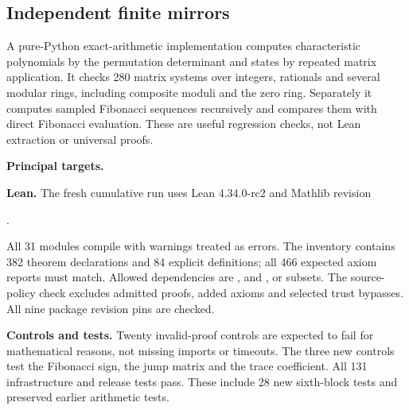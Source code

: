 \subsection*{Independent finite mirrors}
A pure-Python exact-arithmetic implementation computes characteristic polynomials by the permutation determinant and states by repeated matrix application. It checks 280 matrix systems over integers, rationals and several modular rings, including composite moduli and the zero ring. Separately it computes sampled Fibonacci sequences recursively and compares them with direct Fibonacci evaluation. These are useful regression checks, not Lean extraction or universal proofs.

\textbf{Principal targets.}\par
{}\par
{}\par
{}\par
{}\par
{}
\par\medskip
{}
\textbf{Lean.} The fresh cumulative run uses Lean 4.34.0-rc2 and Mathlib revision
\begin{center}\small{}.\end{center}
All 31 modules compile with warnings treated as errors. The inventory contains 382 theorem declarations and 84 explicit definitions; all 466 expected axiom reports must match. Allowed dependencies are ,  and , or subsets. The source-policy check excludes admitted proofs, added axioms and selected trust bypasses. All nine package revision pins are checked.

\textbf{Controls and tests.} Twenty invalid-proof controls are expected to fail for mathematical reasons, not missing imports or timeouts. The three new controls test the Fibonacci sign, the jump matrix and the trace coefficient. All 131 infrastructure and release tests pass. These include 28 new sixth-block tests and preserved earlier arithmetic tests.


